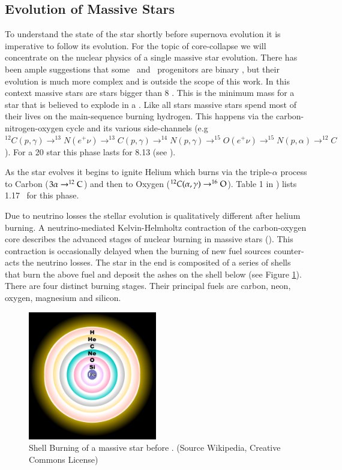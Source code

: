 \subsection{Evolution of Massive Stars}  To understand the state of the star shortly before supernova evolution it is imperative to follow its evolution. For the topic of core-collapse we will concentrate on the nuclear physics of a single massive star evolution. There has been ample suggestions that some \snii\ and \snibc\ progenitors are binary \citep{1992ApJ...391..246P}, but their evolution is much more complex and is outside the scope of this work.  In this context massive stars are stars bigger than 8 \msun. This is the minimum mass for a star that is believed to explode in a \snii. Like all stars massive stars spend most of their lives on the main-sequence burning hydrogen. This happens via the carbon-nitrogen-oxygen cycle and its various side-channels (e.g $^{12}C(p,\gamma)\rightarrow^{13}N(e^+\nu)\rightarrow^{13}C(p,\gamma)\rightarrow^{14}N(p,\gamma)\rightarrow^{15}O(e^+\nu)\rightarrow^{15}N(p,\alpha)\rightarrow^{12}C$). For a 20 \msun star this phase lasts for 8.13 \myr (see \citet{2002RvMP...74.1015W}).

As the star evolves it begins to ignite Helium which burns via the triple-$\alpha$ process to Carbon ($3\alpha\rightarrow^{12}\textrm{C}$) and then to Oxygen ($^{12}C(\alpha,\gamma)\rightarrow^{16}\textrm{O}$). Table 1 in \citet{2002RvMP...74.1015W}) lists 1.17 \myr\ for this phase. 

Due to neutrino losses the stellar evolution is qualitatively different after helium burning. A neutrino-mediated Kelvin-Helmholtz contraction of the carbon-oxygen core describes the advanced stages of nuclear burning in massive stars (\citet{2002RvMP...74.1015W}). This contraction is occasionally delayed when the burning of new fuel sources counter-acts the neutrino losses. The star in the end is composited of a series of shells that burn the above fuel and deposit the ashes on the shell below (see Figure \ref{fig:fusion_shells}). There are four distinct burning stages. Their principal fuels are carbon, neon, oxygen, magnesium and silicon.

\begin{figure}[htbp] %
   \centering
   \includegraphics[width=0.5\textwidth]{chapter_intro/plots/fusion_shells.pdf} 
   \caption{Shell Burning of a massive star before \snii. (Source  Wikipedia, Creative Commons License)}
   \label{fig:fusion_shells}
\end{figure}



